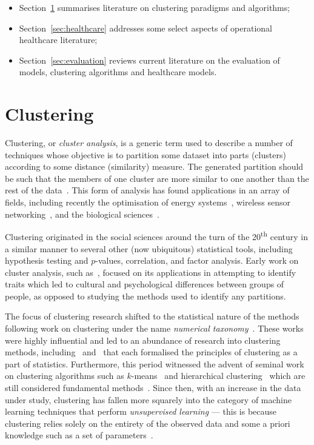 \begin{itemize}
    \item Section~\ref{sec:clustering} summarises literature on clustering
        paradigms and algorithms;
    \item Section~\ref{sec:healthcare} addresses some select aspects of
        operational healthcare literature;
    \item Section~\ref{sec:evaluation} reviews current literature on the
        evaluation of models, clustering algorithms and healthcare models.
\end{itemize}


\section{Clustering}\label{sec:clustering}
\graphicspath{{chapters/lit/paper/img/clusters/}}

Clustering, or \emph{cluster analysis}, is a generic term used to describe a
number of techniques whose objective is to partition some dataset into parts
(clusters) according to some distance (similarity) measure. The generated
partition should be such that the members of one cluster are more similar to one
another than the rest of the data~\cite{Everitt2011}. This form of analysis has
found applications in an array of fields, including recently the optimisation of
energy systems~\cite{Jing2019,Teichgraeber2019}, wireless sensor
networking~\cite{Goswami2019}, and the biological
sciences~\cite{Bulut2020,Kiselev2019}.

Clustering originated in the social sciences around the turn of the
20\textsuperscript{th} century in a similar manner to several other (now
ubiquitous) statistical tools, including hypothesis testing and \(p\)-values,
correlation, and factor analysis. Early work on cluster analysis, such
as~\cite{Cattell1943,Driver1932}, focused on its applications in attempting to
identify traits which led to cultural and psychological differences between
groups of people, as opposed to studying the methods used to identify any
partitions.

The focus of clustering research shifted to the statistical nature of the
methods following work on clustering under the name \emph{numerical
taxonomy}~\cite{Sneath1973,Sokal1966}. These works were highly influential and
led to an abundance of research into clustering methods,
including~\cite{Diday1976} and~\cite{Hartigan1975} that each formalised the
principles of clustering as a part of statistics. Furthermore, this period
witnessed the advent of seminal work on clustering algorithms such as
\(k\)-means~\cite{Hartigan1979} and hierarchical
clustering~\cite{Defays1977,Sibson1973} which are still considered fundamental
methods~\cite{Aggarwal2013,Wu2009}. Since then, with an increase in the data
under study, clustering has fallen more squarely into the category of machine
learning techniques that perform \emph{unsupervised learning} --- this is
because clustering relies solely on the entirety of the observed data and some a
priori knowledge such as a set of parameters~\cite{Dayan1999}.

